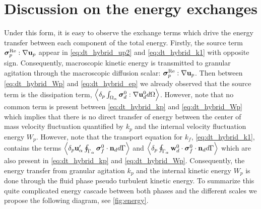\section{Discussion on the energy exchanges}

Under this form, it is easy to observe the exchange terms which drive the energy transfer between each component of the total energy. 
Firstly, the source term $\bm{\sigma}_p^\text{Re} :\mathbf{\nabla} \textbf{u}_p$ appear in \ref{eq:dt_hybrid_up2} and \ref{eq:dt_hybrid_k1} with opposite sign. 
Consequently, macroscopic kinetic energy is transmitted to granular agitation through the macroscopic diffusion scalar: $\bm{\sigma}_p^\text{Re} :\mathbf{\nabla} \textbf{u}_p$. 
Then between \ref{eq:dt_hybrid_Wp} and \ref{eq:dt_hybrid_ep} we already observed that the source term is the dissipation term,  $\left<\delta_p \int_{\Omega_{\alpha}} \bm{\sigma}_d^0:\mathbf{\nabla} \textbf{u}_d^0 d\Omega\right>$.
However, note that no common term is present between \ref{eq:dt_hybrid_kp} and \ref{eq:dt_hybrid_Wp} which implies that there is no direct transfer of energy between the center of mass velocity fluctuation quantified by $k_p$ and the internal velocity fluctuation energy $W_p$. 
However, note that the transport equation for $k_f$, \ref{eq:dt_hybrid_k1}, contains the terms $\left<\delta_p \textbf{u}_\alpha' \oint_{\Gamma_{\alpha}} \bm{\sigma}_f^0 \cdot \textbf{n}_d d\Gamma\right>$ and $\left<\delta_p \oint_{\Gamma_{\alpha}} \textbf{w}_d^0 \cdot \bm{\sigma}_f^0 \cdot \textbf{n}_d d\Gamma\right>$ which are also present in \ref{eq:dt_hybrid_kp} and \ref{eq:dt_hybrid_Wp}. 
Consequently, the energy transfer from granular agitation $k_p$ and the internal kinetic energy $W_p$ is done through the fluid phase pseudo turbulent kinetic energy. 
To summarize this quite complicated energy cascade between both phases and the different scales we propose the following diagram, see \ref{fig:energy}. 
